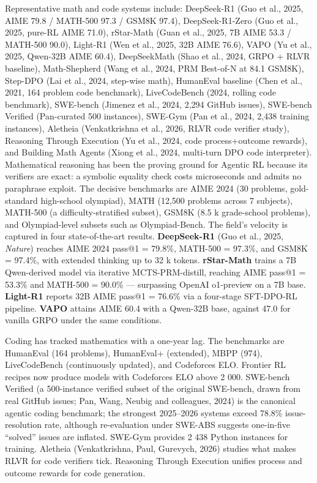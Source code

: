 \documentclass{article}
\begin{document}
Representative math and code systems include: DeepSeek-R1 (Guo et al., 2025, AIME 79.8 / MATH-500 97.3 / GSM8K 97.4), DeepSeek-R1-Zero (Guo et al., 2025, pure-RL AIME 71.0), rStar-Math (Guan et al., 2025, 7B AIME 53.3 / MATH-500 90.0), Light-R1 (Wen et al., 2025, 32B AIME 76.6), VAPO (Yu et al., 2025, Qwen-32B AIME 60.4), DeepSeekMath (Shao et al., 2024, GRPO + RLVR baseline), Math-Shepherd (Wang et al., 2024, PRM Best-of-N at 84.1 GSM8K), Step-DPO (Lai et al., 2024, step-wise math), HumanEval baseline (Chen et al., 2021, 164 problem code benchmark), LiveCodeBench (2024, rolling code benchmark), SWE-bench (Jimenez et al., 2024, 2,294 GitHub issues), SWE-bench Verified (Pan-curated 500 instances), SWE-Gym (Pan et al., 2024, 2,438 training instances), Aletheia (Venkatkrishna et al., 2026, RLVR code verifier study), Reasoning Through Execution (Yu et al., 2024, code process+outcome rewards), and Building Math Agents (Xiong et al., 2024, multi-turn DPO code interpreter). Mathematical reasoning has been the proving ground for Agentic RL because its verifiers are exact: a symbolic equality check costs microseconds and admits no paraphrase exploit. The decisive benchmarks are AIME 2024 (30 problems, gold-standard high-school olympiad), MATH (12,500 problems across 7 subjects), MATH-500 (a difficulty-stratified subset), GSM8K (8.5 k grade-school problems), and Olympiad-level subsets such as Olympiad-Bench. The field's velocity is captured in four state-of-the-art results. \textbf{DeepSeek-R1} (Guo et al., 2025, \emph{Nature}) reaches AIME 2024 pass@1 = 79.8\%, MATH-500 = 97.3\%, and GSM8K = 97.4\%, with extended thinking up to 32 k tokens. \textbf{rStar-Math} \citep{guan20252025} trains a 7B Qwen-derived model via iterative MCTS-PRM-distill, reaching AIME pass@1 = 53.3\% and MATH-500 = 90.0\% --- surpassing OpenAI o1-preview on a 7B base. \textbf{Light-R1} \citep{wen20252025} reports 32B AIME pass@1 = 76.6\% via a four-stage SFT-DPO-RL pipeline. \textbf{VAPO} \citep{yu20252025} attains AIME 60.4 with a Qwen-32B base, against 47.0 for vanilla GRPO under the same conditions.

Coding has tracked mathematics with a one-year lag. The benchmarks are HumanEval (164 problems), HumanEval+ (extended), MBPP (974), LiveCodeBench (continuously updated), and Codeforces ELO. Frontier RL recipes now produce models with Codeforces ELO above 2 000. SWE-bench Verified (a 500-instance verified subset of the original SWE-bench, drawn from real GitHub issues; Pan, Wang, Neubig and colleagues, 2024) is the canonical agentic coding benchmark; the strongest 2025--2026 systems exceed 78.8\% issue-resolution rate, although re-evaluation under SWE-ABS \citep{yu20262026} suggests one-in-five ``solved'' issues are inflated. SWE-Gym provides 2 438 Python instances for training. Aletheia (Venkatkrishna, Paul, Gurevych, 2026) studies what makes RLVR for code verifiers tick. Reasoning Through Execution \citep{yu20242024} unifies process and outcome rewards for code generation.
\end{document}
